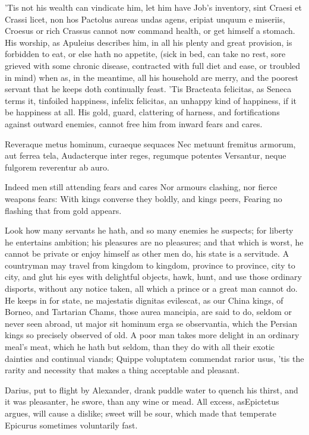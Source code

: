 {'Tis not his wealth can vindicate him, let him have Job's inventory,
sint Craesi et Crassi licet, non hos Pactolus aureas undas agens,
eripiat unquum e miseriis, Croesus or rich Crassus cannot now command
health, or get himself a stomach. His worship, as Apuleius
describes him, in all his plenty and great provision, is forbidden to
eat, or else hath no appetite, (sick in bed, can take no rest, sore
grieved with some chronic disease, contracted with full diet and ease,
or troubled in mind) when as, in the meantime, all his household are
merry, and the poorest servant that he keeps doth continually feast.
'Tis Bracteata felicitas, as  Seneca terms it, tinfoiled
happiness, infelix felicitas, an unhappy kind of happiness, if it be
happiness at all. His gold, guard, clattering of harness, and
fortifications against outward enemies, cannot free him from inward
fears and cares.

Reveraque metus hominum, curaeque sequaces
Nec metuunt fremitus armorum, aut ferrea tela,
Audacterque inter reges, regumque potentes
Versantur, neque fulgorem reverentur ab auro.

Indeed men still attending fears and cares
Nor armours clashing, nor fierce weapons fears:
With kings converse they boldly, and kings peers,
Fearing no flashing that from gold appears.

Look how many servants he hath, and so many enemies he suspects; for
liberty he entertains ambition; his pleasures are no pleasures; and
that which is worst, he cannot be private or enjoy himself as other men
do, his state is a servitude. A countryman may travel from
kingdom to kingdom, province to province, city to city, and glut his
eyes with delightful objects, hawk, hunt, and use those ordinary
disports, without any notice taken, all which a prince or a great man
cannot do. He keeps in for state, ne majestatis dignitas evilescat, as
our China kings, of Borneo, and Tartarian Chams, those aurea mancipia,
are said to do, seldom or never seen abroad, ut major sit hominum erga
se observantia, which the Persian kings so precisely observed of
old. A poor man takes more delight in an ordinary meal's meat, which he
hath but seldom, than they do with all their exotic dainties and
continual viands; Quippe voluptatem commendat rarior usus, 'tis the
rarity and necessity that makes a thing acceptable and pleasant.

Darius, put to flight by Alexander, drank puddle water to quench his
thirst, and it was pleasanter, he swore, than any wine or mead. All
excess, asEpictetus argues, will cause a dislike; sweet will be
sour, which made that temperate Epicurus sometimes voluntarily fast.

}
